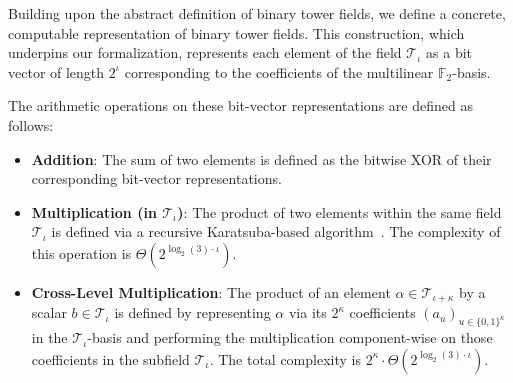 \begin{definition}
  \leanok
  \label{def:computable_binary_tower_field}
  Building upon the abstract definition of binary tower fields, we define a concrete, computable representation of binary tower fields. This construction, which underpins our formalization, represents each element of the field $\mathcal{T}_\iota$ as a bit vector of length $2^\iota$ corresponding to the coefficients of the multilinear $\mathbb{F}_2$-basis.

  The arithmetic operations on these bit-vector representations are defined as follows:
  \begin{itemize}
      \item \textbf{Addition}: The sum of two elements is defined as the bitwise XOR of their corresponding bit-vector representations.

      \item \textbf{Multiplication (in $\mathcal{T}_\iota$)}: The product of two elements within the same field $\mathcal{T}_\iota$ is defined via a recursive Karatsuba-based algorithm~\cite{FP97}. The complexity of this operation is $\Theta(2^{\log_2(3) \cdot \iota})$.

      \item \textbf{Cross-Level Multiplication}: The product of an element $\alpha \in \mathcal{T}_{\iota+\kappa}$ by a scalar $b \in \mathcal{T}_\iota$ is defined by representing $\alpha$ via its $2^\kappa$ coefficients $(a_u)_{u \in \{0,1\}^\kappa}$ in the $\mathcal{T}_\iota$-basis and performing the multiplication component-wise on those coefficients in the subfield $\mathcal{T}_\iota$. The total complexity is $2^\kappa \cdot \Theta(2^{\log_2(3) \cdot \iota})$.
  \end{itemize}
\end{definition}
